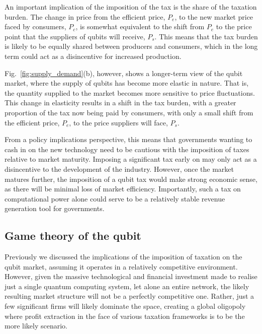 An important implication of the imposition of the tax is the share of the taxation burden. The change in price from the efficient price, $P_e$, to the new market price faced by consumers, $P_c$, is somewhat equivalent to the shift from $P_e$ to the price point that the suppliers of qubits will receive, $P_s$. This means that the tax burden is likely to be equally shared between producers and consumers, which in the long term could act as a disincentive for increased production.

Fig.~\ref{fig:supply_demand}(b), however, shows a longer-term view of the qubit market, where the supply of qubits has become more elastic in nature. That is, the quantity supplied to the market becomes more sensitive to price fluctuations. This change in elasticity results in a shift in the tax burden, with a greater proportion of the tax now being paid by consumers, with only a small shift from the efficient price, $P_e$, to the price suppliers will face, $P_s$. 

From a policy implications perspective, this means that governments wanting to cash in on the new technology need to be cautious with the imposition of taxes relative to market maturity. Imposing a significant tax early on may only act as a disincentive to the development of the industry. However, once the market matures further, the imposition of a qubit tax would make strong economic sense, as there will be minimal loss of market efficiency. Importantly, such a tax on computational power alone could serve to be a relatively stable revenue generation tool for governments. 

%
%

\subsection{Game theory of the qubit}\label{sec:game_theory}

Previously we discussed the implications of the imposition of taxation on the qubit market, assuming it operates in a relatively competitive environment. However, given the massive technological and financial investment made to realise just a single quantum computing system, let alone an entire network, the likely resulting market structure will not be a perfectly competitive one. Rather, just a few significant firms will likely dominate the space, creating a global oligopoly where profit extraction in the face of various taxation frameworks is to be the more likely scenario. 

